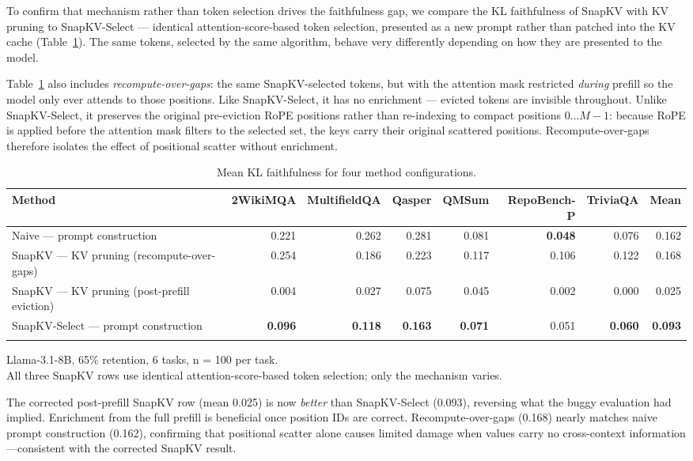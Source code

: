 \documentclass[10pt,letterpaper]{article}
\begin{document}
To confirm that mechanism rather than token selection drives the
faithfulness gap, we compare the KL faithfulness of SnapKV with KV pruning to SnapKV-Select ---
identical attention-score-based token selection, presented as a new
prompt rather than patched into the KV cache (Table~\ref{tab:t1}). The same tokens,
selected by the same algorithm, behave very differently depending on how
they are presented to the model. 

Table~\ref{tab:t1} also includes \emph{recompute-over-gaps}: the same
SnapKV-selected tokens, but with the attention mask restricted
\emph{during} prefill so the model only ever attends to those positions.
Like SnapKV-Select, it has no enrichment --- evicted tokens are
invisible throughout. Unlike SnapKV-Select, it preserves the original
pre-eviction RoPE positions rather than re-indexing to compact positions
$0\ldots M-1$: because RoPE is applied before the attention mask
filters to the selected set, the keys carry their original scattered
positions. Recompute-over-gaps therefore isolates the effect of
positional scatter without enrichment.
\begin{table}[H]
\centering
\small
\caption{Mean KL faithfulness for four method configurations.}
\label{tab:t1}
\begin{tabular}{@{}>{\raggedright\arraybackslash}p{}rrrrrrr@{}}
\toprule
Method & 2WikiMQA & MultifieldQA & Qasper & QMSum & RepoBench-P & TriviaQA & Mean\\
\midrule
Naive --- prompt construction & 0.221 & 0.262 & 0.281 & 0.081 & \textbf{0.048} & 0.076 & 0.162\\
SnapKV --- KV pruning (recompute-over-gaps) & 0.254 & 0.186 & 0.223 & 0.117 & 0.106 & 0.122 & 0.168\\
SnapKV --- KV pruning (post-prefill eviction) & 0.004 & 0.027 & 0.075 & 0.045 & 0.002 & 0.000 & 0.025\\
SnapKV-Select --- prompt construction & \textbf{0.096} & \textbf{0.118} & \textbf{0.163} & \textbf{0.071} & 0.051 & \textbf{0.060} & \textbf{0.093}\\
\bottomrule
\\
\end{tabular}
Llama-3.1-8B, 65\% retention, 6 tasks, n = 100 per task.\\All three
SnapKV rows use identical attention-score-based token selection; only
the mechanism varies.
\end{table}

The corrected post-prefill SnapKV row (mean 0.025) is now \emph{better} than
SnapKV-Select (0.093), reversing what the buggy evaluation had implied.
Enrichment from the full prefill is beneficial once position IDs are correct.
Recompute-over-gaps (0.168) nearly matches naive prompt construction (0.162),
confirming that positional scatter alone causes limited damage when values carry
no cross-context information---consistent with the corrected SnapKV result.
\end{document}
